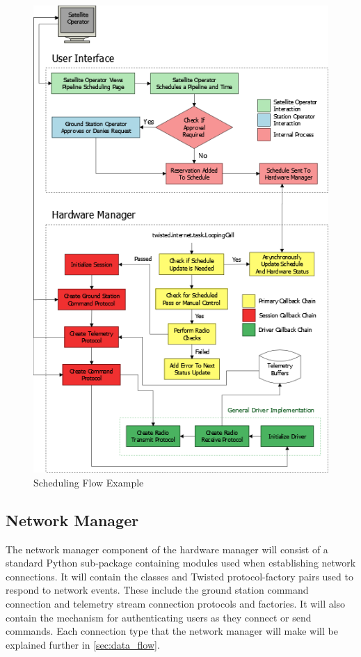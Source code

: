 \documentclass{mxl-design}
\begin{document}
\begin{figure}[hbtp]
	\centering
	\includegraphics[scale=.55]{reservation_flow.png}
	\caption{Scheduling Flow Example}
	\label{schedule_flow}
\end{figure}

\subsection{Network Manager}
\label{sec:network_manager}
The network manager component of the hardware manager will consist of a standard Python sub-package containing modules used when establishing network connections. It will contain the classes and Twisted protocol-factory pairs used to respond to network events. These include the ground station command connection and telemetry stream connection protocols and factories. It will also contain the mechanism for authenticating users as they connect or send commands. Each connection type that the network manager will make will be explained further in \ref{sec:data_flow}.
\end{document}
